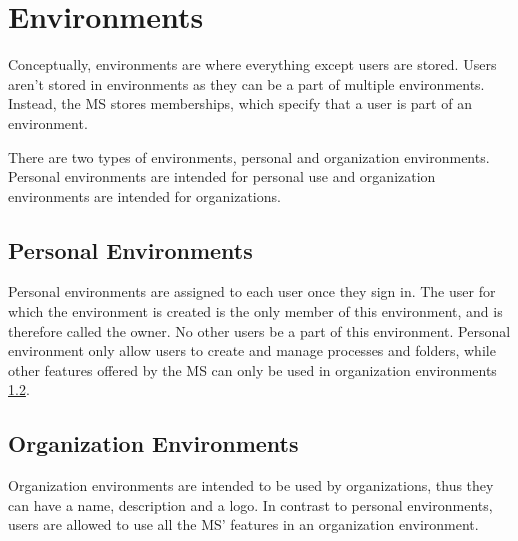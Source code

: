 


\section{Environments}
\label{cha:conceptanddesign:environments}

Conceptually, environments are where everything except users are stored.
Users aren't stored in environments as they can be a part of multiple environments.
Instead, the MS stores memberships, which specify that a user is part of an environment.

There are two types of environments, personal and organization environments.
Personal environments are intended for personal use and organization environments are intended
for organizations.

\subsection{Personal Environments}
\label{cha:conceptanddesign:environments:personal}

Personal environments are assigned to each user once they sign in.
The user for which the environment is created is the only member of this
environment, and is therefore called the owner.
No other users be a part of this environment.
Personal environment only allow users to create and manage processes and folders,
while other features offered by the MS can only be used in organization environments
\ref{cha:conceptanddesign:environments:organization}.

\subsection{Organization Environments}
\label{cha:conceptanddesign:environments:organization}

Organization environments are intended to be used by organizations, thus they can have a
name, description and a logo.
In contrast to personal environments, users are allowed to use all the MS' features in
an organization environment.

